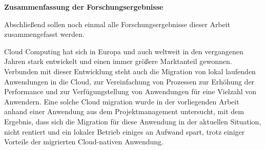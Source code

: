 \textbf{Zusammenfassung der Forschungsergebnisse}

Abschließend sollen noch einmal alle Forschungsergebnisse dieser Arbeit zusammengefasst werden.

Cloud Computing hat sich in Europa und auch weltweit in den vergangenen Jahren stark entwickelt und einen immer größere Marktanteil gewonnen. Verbunden mit dieser Entwicklung steht auch die Migration von lokal laufenden Anwendungen in die Cloud, zur Vereinfachung von Prozessen zur Erhöhung der Performance und zur Verfügungstellung von Anwendungen für eine Vielzahl von Anwendern. Eine solche Cloud migration wurde in der vorliegenden Arbeit anhand einer Anwendung aus dem Projektmanagement untersucht, mit dem Ergebnis, dass sich die Migration für diese Anwendung in der aktuellen Situation, nicht rentiert und ein lokaler Betrieb einiges an Aufwand spart, trotz einiger Vorteile der migrierten Cloud-nativen Anwendung.